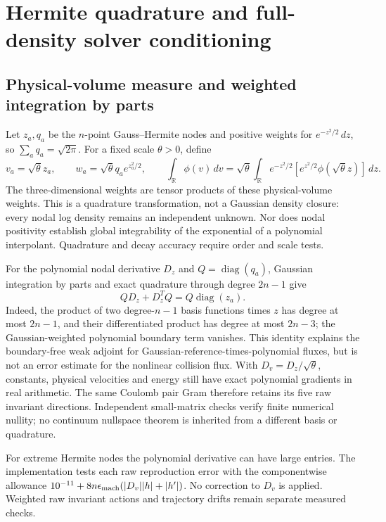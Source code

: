 \documentclass[11pt,letterpaper]{article}
\begin{document}
\section{Hermite quadrature and full-density solver conditioning}
\subsection{Physical-volume measure and weighted integration by parts}
Let $z_a,q_a$ be the $n$-point Gauss--Hermite nodes and positive weights for
$e^{-z^2/2}\,dz$, so $\sum_aq_a=\sqrt{2\pi}$. For a fixed scale
$\theta>0$, define
\[
 v_a=\sqrt\theta z_a,\qquad
 w_a=\sqrt\theta q_a e^{z_a^2/2},\qquad
 \int_{\mathbb R}\phi(v)\,dv
 =\sqrt\theta\int_{\mathbb R}e^{-z^2/2}
       [e^{z^2/2}\phi(\sqrt\theta z)]\,dz.
\]
The three-dimensional weights are tensor products of these physical-volume
weights. This is a quadrature transformation, not a Gaussian density closure:
every nodal log density remains an independent unknown. Nor does nodal
positivity establish global integrability of the exponential of a polynomial
interpolant. Quadrature and decay accuracy require order and scale tests.

For the polynomial nodal derivative $D_z$ and $Q=\operatorname{diag}(q_a)$,
Gaussian integration by parts and exact quadrature through degree $2n-1$ give
\[
 QD_z+D_z^TQ=Q\operatorname{diag}(z_a).
\]
Indeed, the product of two degree-$n-1$ basis functions times $z$ has degree
at most $2n-1$, and their differentiated product has degree at most $2n-3$;
the Gaussian-weighted polynomial boundary term vanishes. This identity
explains the boundary-free weak adjoint for Gaussian-reference-times-polynomial
fluxes, but is not an error estimate for the nonlinear collision flux. With
$D_v=D_z/\sqrt\theta$, constants, physical velocities and energy still have
exact polynomial gradients in real arithmetic. The same Coulomb pair Gram
therefore retains its five raw invariant directions. Independent small-matrix
checks verify finite numerical nullity; no continuum nullspace theorem is
inherited from a different basis or quadrature.

For extreme Hermite nodes the polynomial derivative can have large entries.
The implementation tests each raw reproduction error with the componentwise
allowance $10^{-11}+8n\epsilon_{\rm mach}(|D_v||h|+|h'|)$. No correction to
$D_v$ is applied. Weighted raw invariant actions and trajectory drifts remain
separate measured checks.
\end{document}
